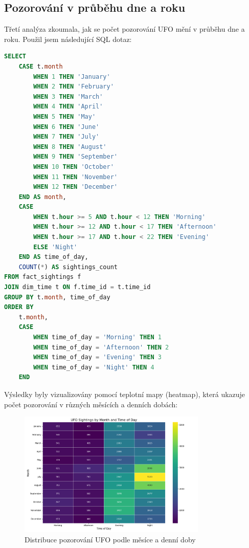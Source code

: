 \documentclass[a4paper,12pt]{article}
\begin{document}
\subsection{Pozorování v průběhu dne a roku}
Třetí analýza zkoumala, jak se počet pozorování UFO mění v průběhu dne a roku. Použil jsem následující SQL dotaz:

\begin{lstlisting}[language=sql, caption=SQL dotaz pro počet pozorování podle měsíce a denní doby]
SELECT 
    CASE t.month
        WHEN 1 THEN 'January'
        WHEN 2 THEN 'February'
        WHEN 3 THEN 'March'
        WHEN 4 THEN 'April'
        WHEN 5 THEN 'May'
        WHEN 6 THEN 'June'
        WHEN 7 THEN 'July'
        WHEN 8 THEN 'August'
        WHEN 9 THEN 'September'
        WHEN 10 THEN 'October'
        WHEN 11 THEN 'November'
        WHEN 12 THEN 'December'
    END AS month,
    CASE
        WHEN t.hour >= 5 AND t.hour < 12 THEN 'Morning'
        WHEN t.hour >= 12 AND t.hour < 17 THEN 'Afternoon' 
        WHEN t.hour >= 17 AND t.hour < 22 THEN 'Evening'
        ELSE 'Night'
    END AS time_of_day,
    COUNT(*) AS sightings_count
FROM fact_sightings f
JOIN dim_time t ON f.time_id = t.time_id
GROUP BY t.month, time_of_day
ORDER BY 
    t.month,
    CASE 
        WHEN time_of_day = 'Morning' THEN 1
        WHEN time_of_day = 'Afternoon' THEN 2
        WHEN time_of_day = 'Evening' THEN 3
        WHEN time_of_day = 'Night' THEN 4
    END
\end{lstlisting}

Výsledky byly vizualizovány pomocí teplotní mapy (heatmap), která ukazuje počet pozorování v různých měsících a denních dobách:

\begin{figure}[h]
\centering
\includegraphics[width=0.8\textwidth]{../images/ufo_sightings_by_time.png}
\caption{Distribuce pozorování UFO podle měsíce a denní doby}
\end{figure}
\end{document}

